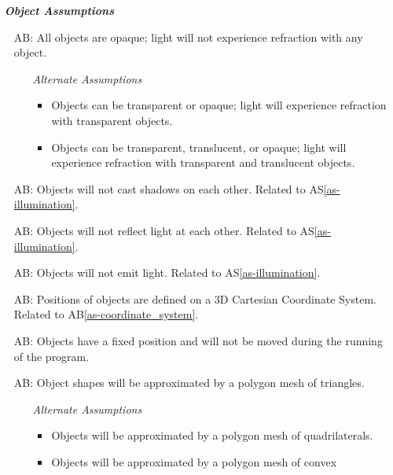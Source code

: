 \documentclass[12pt]{article}
\newcounter{assumpnum} %
\newcommand{\aSref}[1]{AS\ref{#1}}
\newcounter{assumpnumB} %
\newcommand{\aBref}[1]{AB\ref{#1}}
\begin{document}
~\newline
\textbf{\emph{Object Assumptions}}
\begin{itemize}
	\item[AB\refstepcounter{assumpnumB}\theassumpnumB\label{as-object-opaque}:] 
	All objects are opaque; light will not experience refraction with any 
	object. 
	\begin{itemize}
		\item[] \textit{Alternate Assumptions}
		\begin{itemize}
			\item Objects can be transparent or opaque; light will experience 
			refraction with transparent objects.
			\item Objects can be transparent, translucent, or opaque; light 
			will experience refraction with transparent and translucent objects.
		\end{itemize}
	\end{itemize}	
	\item[AB\refstepcounter{assumpnumB}\theassumpnumB\label{as-loc-vs-global}:]
	Objects will not cast shadows on each other. Related to 
	\aSref{as-illumination}.	
	\item[AB\refstepcounter{assumpnumB}\theassumpnumB\label{as-illum_constraint}:]
	Objects will not reflect light at each other. Related to 
	\aSref{as-illumination}.
	\item[AB\refstepcounter{assumpnumB}\theassumpnumB\label{as-emission_constraint}:]
	Objects will not emit light. Related to \aSref{as-illumination}.
	\item[AB\refstepcounter{assumpnumB}\theassumpnumB\label{as-obj-coord}:]
	Positions of objects are defined on a 3D Cartesian Coordinate System. 
	Related to \aBref{as-coordinate_system}.
	\item[AB\refstepcounter{assumpnumB}\theassumpnumB\label{as-obj-pos}:]
	Objects have a fixed position and will not be moved during the running of 
	the program.
	\item[AB\refstepcounter{assumpnumB}\theassumpnumB\label{as-object_mesh}:] 
	Object shapes will be approximated by a polygon mesh of triangles.
	\begin{itemize}
		\item[] \textit{Alternate Assumptions}
		\begin{itemize}
			\item Objects will be approximated by a polygon mesh of 
			quadrilaterals.
			\item Objects will be approximated by a polygon mesh of convex 

\end{itemize}
\end{itemize}
\end{itemize}
\end{document}
